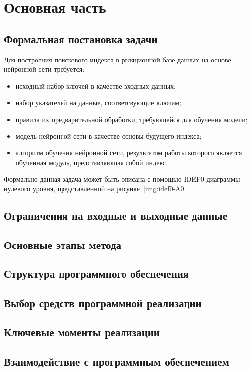\chapter{Основная часть}

\section{Формальная постановка задачи}

Для построения поискового индекса в реляционной базе данных на основе нейронной
сети требуется:

\begin{itemize}
    \item исходный набор ключей в качестве входных данных;
    \item набор указателей на данные, соответсвующие ключам;
    \item правила их предварительной обработки, требующейся для обучения модели;
    \item модель нейронной сети в качестве основы будущего индекса;
    \item алгоритм обучения нейронной сети, результатом работы которого является
        обученная модуль, представляющая собой индекс.
\end{itemize}

Формально данная задача может быть описана с помощью IDEF0-диаграммы нулевого
уровня, представленной на рисунке~\ref{img:idef0-A0}.


\section{Ограничения на входные и выходные данные}

\section{Основные этапы метода}

\section{Структура программного обеспечения}

\section{Выбор средств программной реализации}

\section{Ключевые моменты реализации}

\section{Взаимодействие с программным обеспечением}
